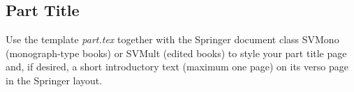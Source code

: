 % 
%
%

\begin{partbacktext}
\part{Part Title}
\noindent Use the template \emph{part.tex} together with the Springer document class SVMono (monograph-type books) or SVMult (edited books) to style your part title page and, if desired, a short introductory text (maximum one page) on its verso page in the Springer layout.

\end{partbacktext}